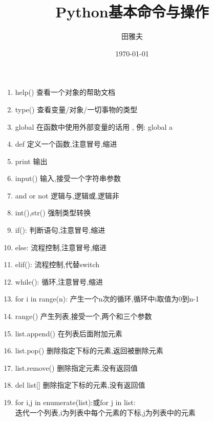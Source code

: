\documentclass[12pt,a4paper]{article}
\title{Python基本命令与操作}	%
\author{田雅夫}
\date{\today}
\begin{document}
\maketitle

\begin{enumerate}
\item help()  查看一个对象的帮助文档

\item type()  查看变量/对象/一切事物的类型

\item global  在函数中使用外部变量的话用 , 例: global a

\item def  定义一个函数,注意冒号,缩进

\item print 输出

\item input()  输入,接受一个字符串参数

\item and or not  逻辑与,逻辑或,逻辑非

\item int(),str() 强制类型转换

\item if(): 判断语句,注意冒号,缩进

\item else: 流程控制,注意冒号,缩进

\item elif():  流程控制,代替switch

\item while(): 循环,注意冒号,缩进

\item for i in range(n): 产生一个n次的循环,循环中i取值为0到n-1

\item range() 产生列表,接受一个,两个和三个参数

\item list.append() 在列表后面附加元素

\item list.pop()  删除指定下标的元素,返回被删除元素

\item list.remove()  删除指定元素,没有返回值

\item del list[]  删除指定下标的元素,没有返回值

\item for i,j in enumerate(list):或for j in list: \\迭代一个列表,i为列表中每个元素的下标,j为列表中的元素


\end{enumerate}
\end{document}
